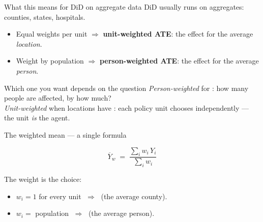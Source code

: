 \documentclass[aspectratio=169,11pt]{beamer}
\begin{document}
\begin{frame}{What this means for DiD on aggregate data}
DiD usually runs on aggregates: counties, states, hospitals.
\begin{itemize}\small
  \item Equal weights per unit $\Rightarrow$ \textbf{unit-weighted ATE}: the effect for the average \textit{location}.
  \item Weight by population $\Rightarrow$ \textbf{person-weighted ATE}: the effect for the average \textit{person}.
\end{itemize}
\vspace{0.3em}
\begin{block}{Which one you want depends on the question}
\small
\textit{Person-weighted} for : how many people are affected, by how much? \\[0.2em]
\textit{Unit-weighted} when locations have : each policy unit chooses independently --- the unit \textit{is} the agent.
\end{block}
\vspace{0.1em}
\end{frame}

\begin{frame}{The weighted mean --- a single formula}
\vspace{0.5em}
\begin{center}
\Large
\[
\overline{Y}_w \;=\; \frac{\sum_i w_i\,Y_i}{\sum_i w_i}
\]
\end{center}

\vspace{1em}
The weight is the choice:
\begin{itemize}\setlength\itemsep{6pt}
  \item $w_i = 1$ for every unit $\;\Rightarrow\;$  (the average county).
  \item $w_i =$ population $\;\Rightarrow\;$  (the average person).
\end{itemize}
\end{frame}
\end{document}
